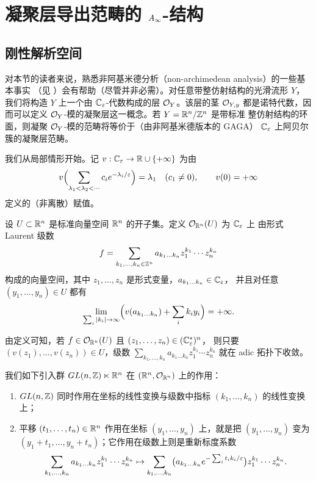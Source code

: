 \section{凝聚层导出范畴的 \texorpdfstring{$A_{\infty}$}{A∞}-结构}

\subsection{刚性解析空间}

对本节的读者来说，熟悉非阿基米德分析（non-archimedean analysis）的一些基本事实
（见 \cite{BGR}）会有帮助（尽管并非必需）。对任意带整仿射结构的光滑流形 $Y$，
我们将构造 $Y$ 上一个由 $\mathbb{C}_{\varepsilon}$-代数构成的层 $\mathcal{O}_Y$。该层的茎 $\mathcal{O}_{Y,y}$
都是诺特代数，因而可以定义 $\mathcal{O}_Y$-模的凝聚层这一概念。若 $Y=\mathbb{R}^n/\mathbb{Z}^n$ 是带标准
整仿射结构的环面，则凝聚 $\mathcal{O}_Y$-模的范畴将等价于（由非阿基米德版本的 GAGA）
$\mathbb{C}_{\varepsilon}$ 上阿贝尔簇的凝聚层范畴。

我们从局部情形开始。记 $v:\mathbb{C}_{\varepsilon}\to\mathbb{R}\cup\{+\infty\}$ 为由
\[
  v\Bigl(\sum_{\lambda_1<\lambda_2<\cdots}c_i e^{-\lambda_i/\varepsilon}\Bigr)=\lambda_1\quad(c_1\neq 0),
  \qquad v(0)=+\infty
\]
定义的（非离散）赋值。

\begin{dfn}
设 $U\subset\mathbb{R}^n$ 是标准向量空间 $\mathbb{R}^n$ 的开子集。定义 $\mathcal{O}_{\mathbb{R}^n}(U)$ 为 $\mathbb{C}_{\varepsilon}$ 上
由形式 Laurent 级数
\[
  f=\sum_{k_1,\dots,k_n\in\mathbb{Z}^n}a_{k_1\dots k_n}z_1^{k_1}\cdots z_n^{k_n}
\]
构成的向量空间，其中 $z_1,\dots,z_n$ 是形式变量，$a_{k_1\dots k_n}\in\mathbb{C}_{\varepsilon}$，
并且对任意 $(y_1,\dots,y_n)\in U$ 都有
\[
  \lim_{\sum_i|k_i|\to\infty}\Bigl(v(a_{k_1\dots k_n})+\sum_i k_i y_i\Bigr)=+\infty .
\]
\end{dfn}

由定义可知，若 $f\in\mathcal{O}_{\mathbb{R}^n}(U)$ 且 $(z_1,\dots,z_n)\in(\mathbb{C}_{\varepsilon}^*)^n$，
则只要 $(v(z_1),\dots,v(z_n))\in U$，级数
$\sum_{k_1,\dots,k_n}a_{k_1\dots k_n}z_1^{k_1}\cdots z_n^{k_n}$
就在 adic 拓扑下收敛。

我们如下引入群 $GL(n,\mathbb{Z})\ltimes\mathbb{R}^n$ 在 $(\mathbb{R}^n,\mathcal{O}_{\mathbb{R}^n})$ 上的作用：
\begin{enumerate}[label=\alph*)]
  \item $GL(n,\mathbb{Z})$ 同时作用在坐标的线性变换与级数中指标 $(k_1,\dots,k_n)$ 的线性变换上；
  \item 平移 $(t_1,\dots,t_n)\in\mathbb{R}^n$ 作用在坐标 $(y_1,\dots,y_n)$ 上，就是把
        $(y_1,\dots,y_n)$ 变为 $(y_1+t_1,\dots,y_n+t_n)$；它作用在级数上则是重新标度系数
\[
  \sum_{k_1,\dots,k_n}a_{k_1\dots k_n}z_1^{k_1}\cdots z_n^{k_n}
  \mapsto
  \sum_{k_1,\dots,k_n}\bigl(a_{k_1\dots k_n}e^{-\sum_i t_i k_i/\varepsilon}\bigr)
  z_1^{k_1}\cdots z_n^{k_n}.
\]
\end{enumerate}

